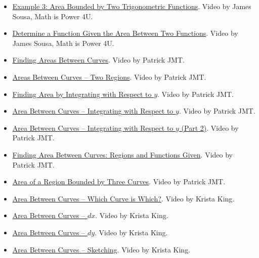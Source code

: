 \begin{itemize}
\item \href{https://www.youtube.com/watch?v=BH-V6Gx2n8E}{Example 3: Area Bounded by Two Trigonometric Functions}.  
Video by James Sousa, Math is Power 4U.

\item \href{https://www.youtube.com/watch?v=N4fEuEQLG5c}{Determine a Function Given the Area Between Two Functions}.  
Video by James Sousa, Math is Power 4U.

\item \href{https://youtu.be/DRFyNHdVgUA}{Finding Areas Between Curves}.  
Video by Patrick JMT.

\item \href{https://youtu.be/1yxSA-FZ0gk}{Areas Between Curves – Two Regions}.  
Video by Patrick JMT.

\item \href{https://youtu.be/iAvF1Rn7How}{Finding Area by Integrating with Respect to $y$}.  
Video by Patrick JMT.

\item \href{https://youtu.be/70NQ3ISYihw}{Area Between Curves – Integrating with Respect to $y$}.  
Video by Patrick JMT.

\item \href{https://youtu.be/Xne6Hv9useE}{Area Between Curves – Integrating with Respect to $y$ (Part 2)}.  
Video by Patrick JMT.

\item \href{https://www.youtube.com/watch?v=M2G68iQzYQE}{Finding Area Between Curves: Regions and Functions Given}.  
Video by Patrick JMT.

\item \href{https://youtu.be/8w9l99W8ucY}{Area of a Region Bounded by Three Curves}.  
Video by Patrick JMT.

\item \href{https://www.youtube.com/watch?v=2j38_za6ztc}{Area Between Curves – Which Curve is Which?}.  
Video by Krista King.

\item \href{https://youtu.be/AeInlCa-1Q8}{Area Between Curves – $dx$}.  
Video by Krista King.

\item \href{https://youtu.be/fGvSy6U209Y}{Area Between Curves – $dy$}.  
Video by Krista King.

\item \href{https://youtu.be/7lrn-8FiTW0}{Area Between Curves – Sketching}.  
Video by Krista King.


\end{itemize}
